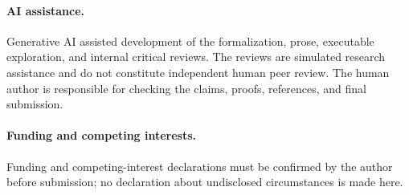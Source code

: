 \documentclass[pdflatex,sn-mathphys-num]{sn-jnl}
\theoremstyle{thmstyleone}
\theoremstyle{thmstylethree}
\theoremstyle{thmstyletwo}
\begin{document}
\paragraph{AI assistance.} Generative AI assisted development of the formalization, prose, executable exploration, and internal critical reviews. The reviews are simulated research assistance and do not constitute independent human peer review. The human author is responsible for checking the claims, proofs, references, and final submission.
\paragraph{Funding and competing interests.} Funding and competing-interest declarations must be confirmed by the author before submission; no declaration about undisclosed circumstances is made here.


\end{document}
